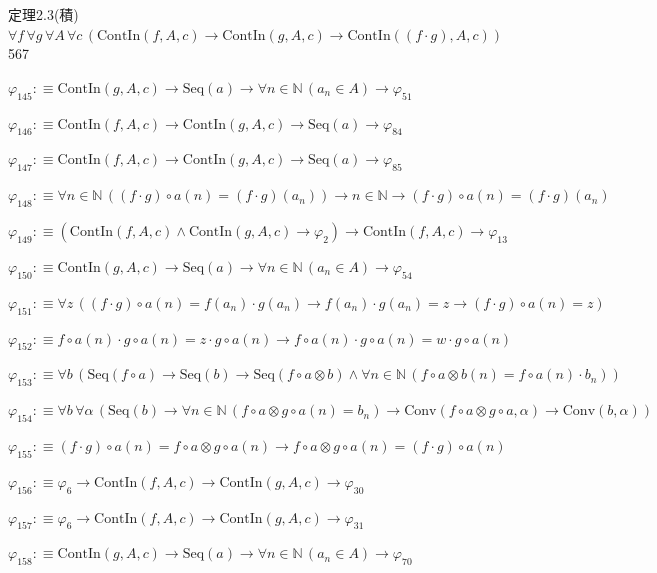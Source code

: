 \begin{fullproof}{定理2.3(積)}{$\forall f\,\forall g\,\forall A\,\forall c\,(\mathrm{ContIn}(f,A,c) \to \mathrm{ContIn}(g,A,c) \to \mathrm{ContIn}((f \cdot g),A,c))$}{567}
\begin{abbrevlist}
\item $\varphi_{145} :\equiv \mathrm{ContIn}(g,A,c) \to \mathrm{Seq}(a) \to \forall n \in \mathbb{N}\,(a_{n} \in A) \to \varphi_{51}$
\item $\varphi_{146} :\equiv \mathrm{ContIn}(f,A,c) \to \mathrm{ContIn}(g,A,c) \to \mathrm{Seq}(a) \to \varphi_{84}$
\item $\varphi_{147} :\equiv \mathrm{ContIn}(f,A,c) \to \mathrm{ContIn}(g,A,c) \to \mathrm{Seq}(a) \to \varphi_{85}$
\item $\varphi_{148} :\equiv \forall n \in \mathbb{N}\,((f \cdot g) \circ a(n) = (f \cdot g)(a_{n})) \to n \in \mathbb{N} \to (f \cdot g) \circ a(n) = (f \cdot g)(a_{n})$
\item $\varphi_{149} :\equiv (\mathrm{ContIn}(f,A,c) \land \mathrm{ContIn}(g,A,c) \to \varphi_{2}) \to \mathrm{ContIn}(f,A,c) \to \varphi_{13}$
\item $\varphi_{150} :\equiv \mathrm{ContIn}(g,A,c) \to \mathrm{Seq}(a) \to \forall n \in \mathbb{N}\,(a_{n} \in A) \to \varphi_{54}$
\item $\varphi_{151} :\equiv \forall z\,((f \cdot g) \circ a(n) = f(a_{n}) \cdot g(a_{n}) \to f(a_{n}) \cdot g(a_{n}) = z \to (f \cdot g) \circ a(n) = z)$
\item $\varphi_{152} :\equiv f \circ a(n) \cdot g \circ a(n) = z \cdot g \circ a(n) \to f \circ a(n) \cdot g \circ a(n) = w \cdot g \circ a(n)$
\item $\varphi_{153} :\equiv \forall b\,(\mathrm{Seq}(f \circ a) \to \mathrm{Seq}(b) \to \mathrm{Seq}(f \circ a \otimes b) \land \forall n \in \mathbb{N}\,(f \circ a \otimes b(n) = f \circ a(n) \cdot b_{n}))$
\item $\varphi_{154} :\equiv \forall b\,\forall \alpha\,(\mathrm{Seq}(b) \to \forall n \in \mathbb{N}\,(f \circ a \otimes g \circ a(n) = b_{n}) \to \mathrm{Conv}(f \circ a \otimes g \circ a,\alpha) \to \mathrm{Conv}(b,\alpha))$
\item $\varphi_{155} :\equiv (f \cdot g) \circ a(n) = f \circ a \otimes g \circ a(n) \to f \circ a \otimes g \circ a(n) = (f \cdot g) \circ a(n)$
\item $\varphi_{156} :\equiv \varphi_{6} \to \mathrm{ContIn}(f,A,c) \to \mathrm{ContIn}(g,A,c) \to \varphi_{30}$
\item $\varphi_{157} :\equiv \varphi_{6} \to \mathrm{ContIn}(f,A,c) \to \mathrm{ContIn}(g,A,c) \to \varphi_{31}$
\item $\varphi_{158} :\equiv \mathrm{ContIn}(g,A,c) \to \mathrm{Seq}(a) \to \forall n \in \mathbb{N}\,(a_{n} \in A) \to \varphi_{70}$

\end{abbrevlist}
\end{fullproof}
